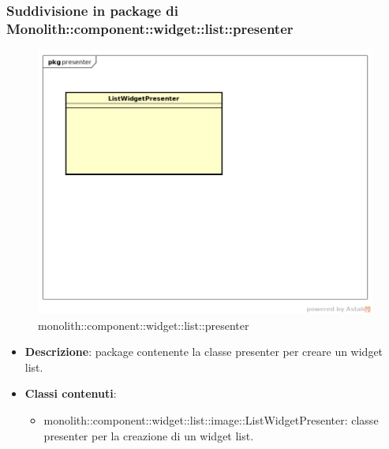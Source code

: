 \subsubsection{Suddivisione in package  di Monolith::component::widget::list::presenter}
\label{monolith::component::widget::list::presenter}
\begin{figure}[H]
	\centering
	\includegraphics[scale=0.5]{Sezioni/imgPackage/component_widget_list_presenter.png}
	\caption{monolith::component::widget::list::presenter}
\end{figure}
\begin{itemize}
	\item{\textbf{Descrizione}}: package contenente la classe presenter per creare un widget list.
	\item{\textbf{Classi contenuti}}:
	\begin{itemize}
	\item{monolith::component::widget::list::image::ListWidgetPresenter}: classe presenter per la creazione di un widget list.
	\end{itemize}
\end{itemize}



